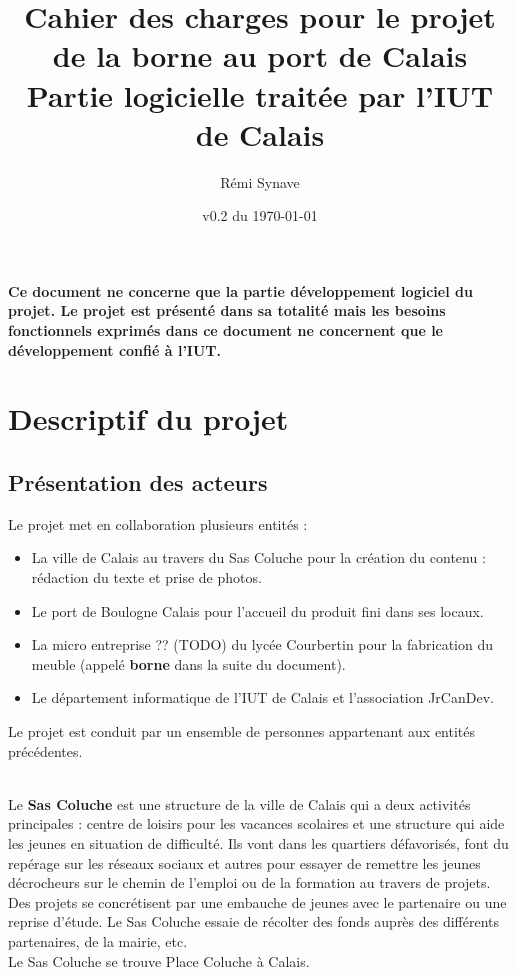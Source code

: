 \documentclass[11pt]{article}
\title{Cahier des charges pour le projet de la borne au port de Calais\\
\large Partie logicielle traitée par l'IUT de Calais}
\author{Rémi Synave}
\date{v0.2 du \today}
\begin{document}
\maketitle

\danger \textbf{Ce document ne concerne que la partie développement logiciel du projet. Le projet est présenté dans sa totalité mais les besoins fonctionnels exprimés dans ce document ne concernent que le développement confié à l'IUT.}

\section{Descriptif du projet}
\subsection{Présentation des acteurs}
Le projet met en collaboration plusieurs entités :
\begin{itemize}
\item La ville de Calais au travers du Sas Coluche pour la création du contenu : rédaction du texte et prise de photos.
\item Le port de Boulogne Calais pour l'accueil du produit fini dans ses locaux.
\item La micro entreprise ?? (TODO) du lycée Courbertin pour la fabrication du meuble (appelé \textbf{borne} dans la suite du document).
\item Le département informatique de l'IUT de Calais et l'association JrCanDev.\\

\end{itemize}
Le projet est conduit par un ensemble de personnes appartenant aux entités précédentes.\\~

Le \textbf{Sas Coluche} est une structure de la ville de Calais qui a deux activités principales : centre de loisirs pour les vacances scolaires et une structure qui aide les jeunes en situation de difficulté. Ils vont dans les quartiers défavorisés, font du repérage sur les réseaux sociaux et autres pour essayer de remettre les jeunes décrocheurs sur le chemin de l'emploi ou de la formation au travers de projets. Des projets se concrétisent par une embauche de jeunes avec le partenaire ou une reprise d'étude. Le Sas Coluche essaie de récolter des fonds auprès des différents partenaires, de la mairie, etc.\\
Le Sas Coluche se trouve Place Coluche à Calais.\\~
\end{document}
